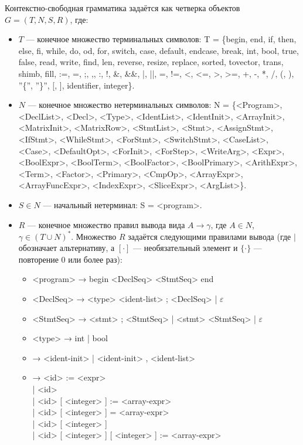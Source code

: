 \documentclass[a4paper,final]{article}
\begin{document}
Контекстно-свободная грамматика задаётся как четверка объектов $G = (T, N, S, R)$, где:
\begin{itemize}
    \item $T$ --- конечное множество терминальных символов: T = \{begin, end, if, then, else, fi, while, do, od, for, switch, case, default, endcase, break, int, bool, true, false, read, write, find, len, reverse, resize, replace, sorted, tovector, trans, shimb, fill, :=, =, ;, ,, :, !, \&, \&\&, |, ||, =, !=, <, <=, >, >=, +, -, *, /, (, ), ''\{'', ''\}'', [, ], identifier, integer\}.
    \item $N$ --- конечное множество нетерминальных символов: N = \{<Program>, <DeclList>, <Decl>, <Type>, <IdentList>, <IdentInit>, <ArrayInit>, <MatrixInit>, <MatrixRow>, <StmtList>, <Stmt>, <AssignStmt>, <IfStmt>, <WhileStmt>, <ForStmt>, <SwitchStmt>, <CaseList>, <Case>, <DefaultOpt>, <ForInit>, <ForStep>, <WriteArg>, <Expr>, <BoolExpr>, <BoolTerm>, <BoolFactor>, <BoolPrimary>, <ArithExpr>, <Term>, <Factor>, <Primary>, <CmpOp>, <ArrayExpr>, <ArrayFuncExpr>, <IndexExpr>, <SliceExpr>, <ArgList>\}.
    \item $S \in N$ --- начальный нетерминал: S = <program>.
    \item $R$ --- конечное множество правил вывода вида $A \to \gamma$, где $A \in N$, $\gamma \in (T \cup N)^*$. Множество $R$ задаётся следующими правилами вывода (где $|$ обозначает альтернативу, а $[\cdot]$ --- необязательный элемент и $\{\cdot\}$ --- повторение 0 или более раз):
    \begin{itemize}
\item <program>      → begin <DeclSeq> <StmtSeq> end
\item <DeclSeq>      → <type> <ident-list> ; <DeclSeq> | \ensuremath{\varepsilon}
\item <StmtSeq>      → <stmt> ; <StmtSeq> | <stmt> <StmtSeq> | \ensuremath{\varepsilon}
\item <type>         → int | bool
\item <ident-list>   → <ident-init> | <ident-init> , <ident-list>
\item <ident-init>   → <id> := <expr>
                \\| <id>
                \\| <id> [ <integer> ] := <array-expr>
                \\| <id> [ <integer> ] = <array-expr>
                \\| <id> [ <integer> ]
                \\| <id> [ <integer> ] [ <integer> ] := <array-expr>

\end{itemize}
\end{itemize}
\end{document}
